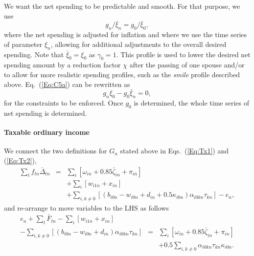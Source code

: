 \documentclass{report}[fleqn,11pt]
\begin{document}
	We want the net spending to be predictable and smooth. For that purpose, we use
\begin{equation}
	\label{Eq:C5a}
	g_{n}/\bar{\xi}_{n} = g_0/\bar{\xi}_0,
\end{equation}
where the net spending is adjusted for inflation and where we use the time series of parameter $\xi_n$,
allowing for additional adjustments to the overall desired spending.
Note that $\bar{\xi}_0 = \xi_0$ as $\gamma_0=1$.
This profile is used to lower the desired net spending amount by a reduction factor $\chi$
after the passing of one spouse and/or to allow for more realistic spending profiles, such as
the {\em smile} profile described above.
Eq.~(\ref{Eq:C5a}) can be rewritten as
\begin{equation}
	\label{Eq:C5}
	g_n \xi_0 - g_0 \bar{\xi}_n = 0,
\end{equation}
for the constraints to be enforced. Once $g_0$ is determined, the whole time series of net spending
is determined.

\paragraph*{Taxable ordinary income}
	We connect the two definitions for $G_n$ stated above in Eqs.~(\ref{Eq:Tx1}) and (\ref{Eq:Tx2}),
	\begin{eqnarray}
		\sum_t f_{t n}\bar{\Delta}_{t n} &=&
		\sum_i [\omega_{in} + 0.85\bar\zeta_{in} + \pi_{in}]  \nonumber \\
		&& + \sum_i [w_{i1n} + x_{in} ]
		\nonumber\\
		&& + \sum_{i,k\neq 0} [(b_{i0n} - w_{i0n} + d_{in}
		     + 0.5\kappa_{i0n})\alpha_{i0kn}\tau_{kn}] - e_n,
	\end{eqnarray}
	and re-arrange to move variables to the LHS as follows
	\begin{eqnarray}
		\label{Eq:C6}
		e_n + \sum_t \bar{F}_{tn}
		- \sum_i [ w_{i1n} + x_{in}] &&
		\nonumber \\
		- \sum_{i,k\neq 0} [(b_{i0n} - w_{i0n} + d_{in})\alpha_{i0kn}\tau_{kn}] &=&
		\sum_i [\omega_{in} + 0.85\bar\zeta_{in} + \pi_{in} ]
		\nonumber \\
		&& + 0.5\sum_{i,k\neq 0} \alpha_{i0kn}\tau_{kn}\kappa_{i0n}.
	\end{eqnarray}
\end{document}
